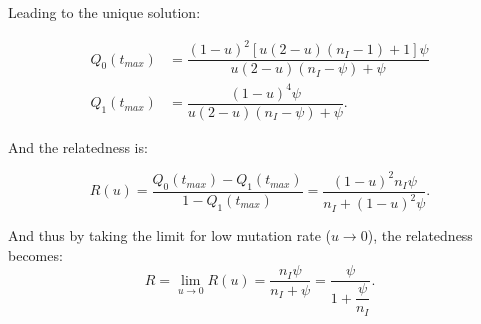 \documentclass{article}
\begin{document}
 Leading to the unique solution:
 
 \begin{align}
 Q_0(t_{max}) &= \dfrac{ (1-u)^2 [u (2 - u)(n_{I}-1) +1 ]\psi }{ u (2-u )(n_{I} - \psi )+\psi }\\
 Q_1(t_{max}) &= \dfrac{(1- u )^4 \psi}{u (2-u) (n_{I} - \psi ) +\psi}.
 \end{align}

 And the relatedness is: 
 
 \begin{equation}
 R(u)=\dfrac{Q_0(t_{max})-Q_1(t_{max})}{1-Q_1(t_{max})}=\dfrac{(1-u)^2 n_{I} \psi}{n_{I} +(1-u)^2 \psi}.
 \end{equation}
 
And thus by taking the limit for low mutation rate ($u \rightarrow 0$), the relatedness becomes:
 \begin{equation}
 R=\lim_{u \to 0} R(u)=\dfrac{n_{I} \psi}{n_{I} + \psi}=\dfrac{\psi}{1+ \dfrac{\psi}{n_{I}}}.
 \end{equation}
 
 
\end{document}
